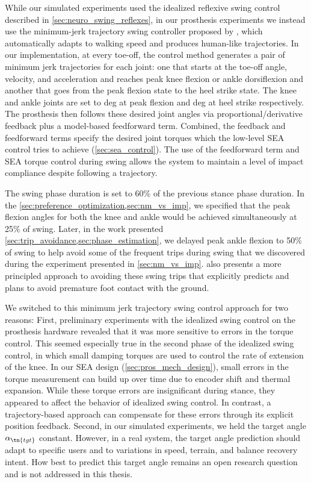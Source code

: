 While our simulated experiments used the idealized reflexive swing control
described in \cref{sec:neuro_swing_reflexes}, in our prosthesis experiments we
instead use the minimum-jerk trajectory swing controller proposed by
\citet{lenzi2014speed}, which automatically adapts to walking speed and produces
human-like trajectories. In our implementation, at every toe-off, the control
method generates a pair of minimum jerk trajectories for each joint: one that
starts at the toe-off angle, velocity, and acceleration and reaches peak knee
flexion or ankle dorsiflexion and another that goes from the peak flexion state
to the heel strike state. The knee and ankle joints are set to \unit[65 and
2]{deg} at peak flexion and \unit[2 and -5]{deg} at heel strike respectively.
The prosthesis then follows these desired joint angles via
proportional/derivative feedback plus a model-based feedforward term. Combined,
the feedback and feedforward terms specify the desired joint torques which the
low-level SEA control tries to achieve (\cref{sec:sea_control}). The use of the
feedforward term and SEA torque control during swing allows the system to
maintain a level of impact compliance despite following a trajectory.

The swing phase duration is set to 60\% of the previous stance phase duration.
In the \cref{sec:preference_optimization,sec:nm_vs_imp}, we specified that the
peak flexion angles for both the knee and ankle would be achieved simultaneously
at 25\% of swing. Later, in the work presented
\cref{sec:trip_avoidance,sec:phase_estimation}, we delayed peak ankle flexion to
50\% of swing to help avoid some of the frequent trips during swing that we
discovered during the experiment presented in \cref{sec:nm_vs_imp}.
 also presents a more principled approach to avoiding
these swing trips that explicitly predicts and plans to avoid premature foot
contact with the ground.

We switched to this minimum jerk trajectory swing control approach for two
reasons: First, preliminary experiments with the idealized swing control on the
prosthesis hardware revealed that it was more sensitive to errors in the torque
control. This seemed especially true in the second phase of the idealized swing
control, in which small damping torques are used to control the rate of
extension of the knee. In our SEA design (\cref{sec:pros_mech_design}), small
errors in the torque measurement can build up over time due to encoder shift and
thermal expansion.  While these torque errors are insignificant during stance,
they appeared to affect the behavior of idealized swing control. In contrast, a
trajectory-based approach can compensate for these errors through its explicit
position feedback. Second, in our simulated experiments, we held the target
angle $\alpha_\tn{tgt}$ constant. However, in a real system, the target angle
prediction should adapt to specific users and to variations in speed, terrain,
and balance recovery intent. How best to predict this target angle remains an
open research question and is not addressed in this thesis.

